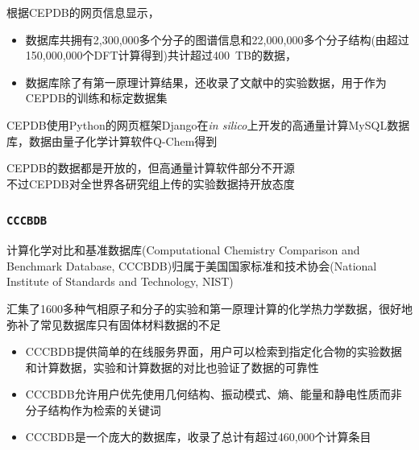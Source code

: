 {{{根据\textrm{CEPDB}的网页信息显示，
\begin{itemize}
	\item 数据库共拥有\textrm{2,300,000}多个分子的图谱信息和\textrm{22,000,000}多个分子结构(由超过\textrm{150,000,000}个\textrm{DFT}计算得到)共计超过\textrm{400~TB}的数据，
	\item 数据库除了有第一原理计算结果，还收录了文献中的实验数据，用于作为\textrm{CEPDB}的训练和标定数据集
\end{itemize}
\textrm{CEPDB}使用\textrm{Python}的网页框架\textrm{Django}在\textit{in silico}上开发的高通量计算\textrm{MySQL}数据库，数据由量子化学计算软件\textrm{Q-Chem}得到\\
{\fontsize{6.5pt}{4.2pt}}

\textrm{CEPDB}的数据都是开放的，但高通量计算软件部分不开源\\不过\textrm{CEPDB}对全世界各研究组上传的实验数据持开放态度
}

\frame
{
\frametitle{\texttt{CCCBDB}}
计算化学对比和基准数据库\textrm{(Computational Chemistry Comparison and Benchmark Database, CCCBDB)}归属于美国国家标准和技术协会(\textrm{National Institute of Standards and Technology, NIST})

汇集了\textrm{1600}多种气相原子和分子的实验和第一原理计算的化学热力学数据，很好地弥补了常见数据库只有固体材料数据的不足

\begin{itemize}
	\item \textrm{CCCBDB}提供简单的在线服务界面，用户可以检索到指定化合物的实验数据和计算数据，实验和计算数据的对比也验证了数据的可靠性
	\item \textrm{CCCBDB}允许用户优先使用几何结构、振动模式、熵、能量和静电性质而非分子结构作为检索的关键词\\
		{\fontsize{7.5pt}{4.2pt}\selectfont{避免引入复杂的筛选组合，方便用户快速得到检索结果}}
	\item \textrm{CCCBDB}是一个庞大的数据库，收录了总计有超过\textrm{460,000}个计算条目\\
{\fontsize{7.5pt}{4.2pt}\selectfont{因为其没有开源，降低了数据库的影响力}}
\end{itemize}
}

}}
